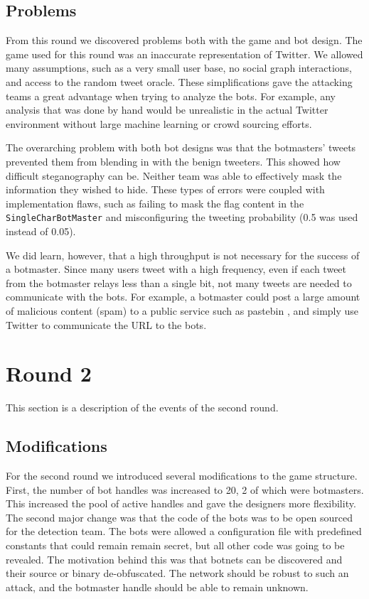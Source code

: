 \documentclass[11pt, oneside]{article} %
\numberwithin{equation}{section} %
\numberwithin{figure}{section} %
\numberwithin{table}{section} %
\renewcommand{\c}[1]{\texttt{#1}}
\begin{document}
	\subsection{Problems}
		From this round we discovered problems both with the game and bot design.
		The game used for this round was an inaccurate representation of Twitter. We allowed many assumptions, such as a very small user base, no social graph interactions, and access to the random tweet oracle. These simplifications gave the attacking teams a great advantage when trying to analyze the bots. For example, any analysis that was done by hand would be unrealistic in the actual Twitter environment without large machine learning or crowd sourcing efforts.
		
		The overarching problem with both bot designs was that the botmasters' tweets prevented them from blending in with the benign tweeters. This showed how difficult steganography can be. Neither team was able to effectively mask the information they wished to hide. These types of errors were coupled with implementation flaws, such as failing to mask the flag content in the \c{SingleCharBotMaster} and misconfiguring the tweeting probability (0.5 was used instead of 0.05).

		We did learn, however, that a high throughput is not necessary for the success of a botmaster. Since many users tweet with a high frequency, even if each tweet from the botmaster relays less than a single bit, not many tweets are needed to communicate with the bots. For example, a botmaster could post a large amount of malicious content (spam) to a public service such as pastebin \cite{pastebin}, and simply use Twitter to communicate the URL to the bots.


\section{Round 2}
	This section is a description of the events of the second round.

	\subsection{Modifications}
		For the second round we introduced several modifications to the game structure. First, the number of bot handles was increased to 20, 2 of which were botmasters. This increased the pool of active handles and gave the designers more flexibility.
		The second major change was that the code of the bots was to be open sourced for the detection team. The bots were allowed a configuration file with predefined constants that could remain remain secret, but all other code was going to be revealed. The motivation behind this was that botnets can be discovered and their source or binary de-obfuscated. The network should be robust to such an attack, and the botmaster handle should be able to remain unknown. 
\end{document}
